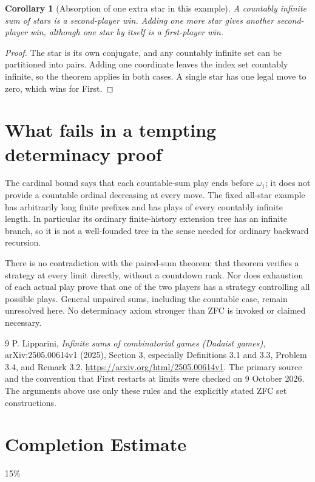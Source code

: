 \documentclass[11pt]{article}
\newtheorem{corollary}[theorem]{Corollary}
\theoremstyle{definition}
\begin{document}
\begin{corollary}[Absorption of one extra star in this example]
A countably infinite sum of stars is a second-player win. Adding one more star gives another second-player win, although one star by itself is a first-player win.
\end{corollary}
\begin{proof}
The star is its own conjugate, and any countably infinite set can be partitioned into pairs. Adding one coordinate leaves the index set countably infinite, so the theorem applies in both cases. A single star has one legal move to zero, which wins for First.
\end{proof}

\section*{What fails in a tempting determinacy proof}
The cardinal bound says that each countable-sum play ends before $\omega_1$; it does not provide a countable ordinal decreasing at every move. The fixed all-star example has arbitrarily long finite prefixes and has plays of every countably infinite length. In particular its ordinary finite-history extension tree has an infinite branch, so it is not a well-founded tree in the sense needed for ordinary backward recursion.

There is no contradiction with the paired-sum theorem: that theorem verifies a strategy at every limit directly, without a countdown rank. Nor does exhaustion of each actual play prove that one of the two players has a strategy controlling all possible plays. General unpaired sums, including the countable case, remain unresolved here. No determinacy axiom stronger than ZFC is invoked or claimed necessary.

\begin{thebibliography}{9}
 P. Lipparini, \emph{Infinite sums of combinatorial games (Dadaist games)}, arXiv:2505.00614v1 (2025), Section 3, especially Definitions 3.1 and 3.3, Problem 3.4, and Remark 3.2. \url{https://arxiv.org/html/2505.00614v1}. The primary source and the convention that First restarts at limits were checked on 9 October 2026. The arguments above use only these rules and the explicitly stated ZFC set constructions.
\end{thebibliography}

\section{Completion Estimate}
15\%
\end{document}
